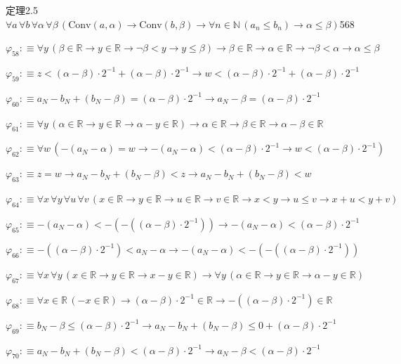 \begin{fullproof}{定理2.5}{$\forall a\,\forall b\,\forall \alpha\,\forall \beta\,(\mathrm{Conv}(a,\alpha) \to \mathrm{Conv}(b,\beta) \to \forall n \in \mathbb{N}\,(a_{n} \leq b_{n}) \to \alpha \leq \beta)$}{568}
\begin{abbrevlist}
\item $\varphi_{58} :\equiv \forall y\,(\beta \in \mathbb{R} \to y \in \mathbb{R} \to \neg \beta < y \to y \leq \beta) \to \beta \in \mathbb{R} \to \alpha \in \mathbb{R} \to \neg \beta < \alpha \to \alpha \leq \beta$
\item $\varphi_{59} :\equiv z < (\alpha - \beta) \cdot 2^{-1} + (\alpha - \beta) \cdot 2^{-1} \to w < (\alpha - \beta) \cdot 2^{-1} + (\alpha - \beta) \cdot 2^{-1}$
\item $\varphi_{60} :\equiv a_{N} - b_{N} + (b_{N} - \beta) = (\alpha - \beta) \cdot 2^{-1} \to a_{N} - \beta = (\alpha - \beta) \cdot 2^{-1}$
\item $\varphi_{61} :\equiv \forall y\,(\alpha \in \mathbb{R} \to y \in \mathbb{R} \to \alpha - y \in \mathbb{R}) \to \alpha \in \mathbb{R} \to \beta \in \mathbb{R} \to \alpha - \beta \in \mathbb{R}$
\item $\varphi_{62} :\equiv \forall w\,(-(a_{N} - \alpha) = w \to -(a_{N} - \alpha) < (\alpha - \beta) \cdot 2^{-1} \to w < (\alpha - \beta) \cdot 2^{-1})$
\item $\varphi_{63} :\equiv z = w \to a_{N} - b_{N} + (b_{N} - \beta) < z \to a_{N} - b_{N} + (b_{N} - \beta) < w$
\item $\varphi_{64} :\equiv \forall x\,\forall y\,\forall u\,\forall v\,(x \in \mathbb{R} \to y \in \mathbb{R} \to u \in \mathbb{R} \to v \in \mathbb{R} \to x < y \to u \leq v \to x + u < y + v)$
\item $\varphi_{65} :\equiv -(a_{N} - \alpha) < -(-((\alpha - \beta) \cdot 2^{-1})) \to -(a_{N} - \alpha) < (\alpha - \beta) \cdot 2^{-1}$
\item $\varphi_{66} :\equiv -((\alpha - \beta) \cdot 2^{-1}) < a_{N} - \alpha \to -(a_{N} - \alpha) < -(-((\alpha - \beta) \cdot 2^{-1}))$
\item $\varphi_{67} :\equiv \forall x\,\forall y\,(x \in \mathbb{R} \to y \in \mathbb{R} \to x - y \in \mathbb{R}) \to \forall y\,(\alpha \in \mathbb{R} \to y \in \mathbb{R} \to \alpha - y \in \mathbb{R})$
\item $\varphi_{68} :\equiv \forall x \in \mathbb{R}\,(-x \in \mathbb{R}) \to (\alpha - \beta) \cdot 2^{-1} \in \mathbb{R} \to -((\alpha - \beta) \cdot 2^{-1}) \in \mathbb{R}$
\item $\varphi_{69} :\equiv b_{N} - \beta \leq (\alpha - \beta) \cdot 2^{-1} \to a_{N} - b_{N} + (b_{N} - \beta) \leq 0 + (\alpha - \beta) \cdot 2^{-1}$
\item $\varphi_{70} :\equiv a_{N} - b_{N} + (b_{N} - \beta) < (\alpha - \beta) \cdot 2^{-1} \to a_{N} - \beta < (\alpha - \beta) \cdot 2^{-1}$

\end{abbrevlist}
\end{fullproof}

